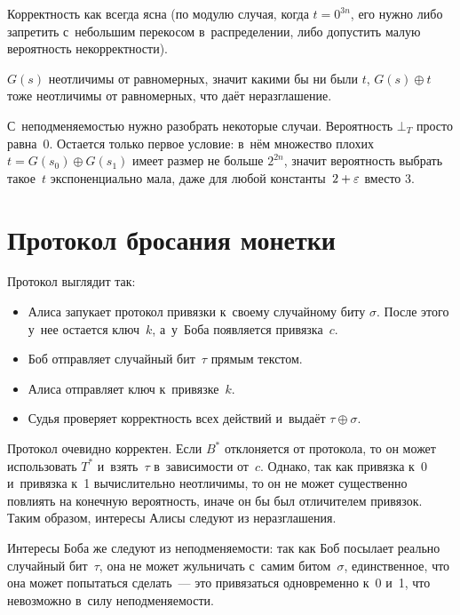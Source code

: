 \documentclass{article}
\begin{document}
Корректность как всегда ясна (по модулю случая, когда $t = 0^{3n}$, его нужно
либо запретить с~небольшим перекосом в~распределении, либо допустить малую
вероятность некорректности).

$G(s)$ неотличимы от равномерных, значит какими бы ни были $t$, $G(s) \oplus t$
тоже неотличимы от равномерных, что даёт неразглашение.

С~неподменяемостью нужно разобрать некоторые случаи. Вероятность $\bot_T$ просто
равна~$0$. Остается только первое условие: в~нём множество плохих $t = G(s_0)
\oplus G(s_1)$ имеет размер не больше $2^{2n}$, значит вероятность выбрать
такое~$t$ экспоненциально мала, даже для любой константы~$2 + \varepsilon$ вместо 3.

\section{Протокол бросания монетки}

Протокол выглядит так:
\begin{itemize}
	\item Алиса запукает протокол привязки к~своему случайному биту $\sigma$.
		После этого у~нее остается ключ~$k$, а~у~Боба появляется привязка~$c$.
	\item Боб отправляет случайный бит~$\tau$ прямым текстом.
	\item Алиса отправляет ключ к~привязке~$k$.
	\item Судья проверяет корректность всех действий и~выдаёт $\tau \oplus
		\sigma$.
\end{itemize}

Протокол очевидно корректен. Если $B^\ast$ отклоняется от протокола, то он может
использовать $T^\ast$ и~взять~$\tau$ в~зависимости от~$c$. Однако, так как
привязка к~0 и~привязка к~1 вычислительно неотличимы, то он не может существенно
повлиять на конечную вероятность, иначе он бы был отличителем привязок. Таким
образом, интересы Алисы следуют из неразглашения.

Интересы Боба же следуют из неподменяемости: так как Боб посылает реально
случайный бит~$\tau$, она не может жульничать с~самим битом~$\sigma$,
единственное, что она может попытаться сделать~--- это привязаться одновременно
к~0 и~1, что невозможно в~силу неподменяемости.
\end{document}
